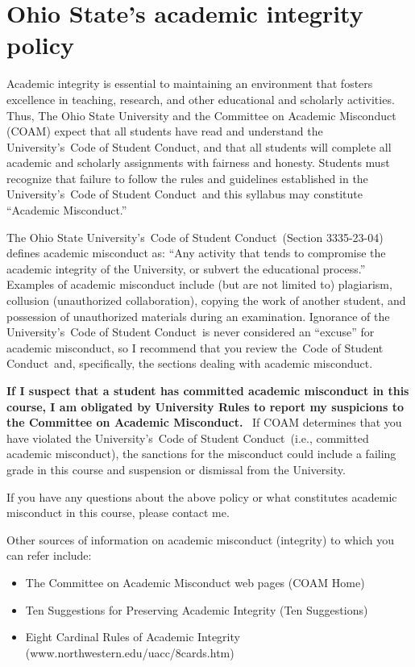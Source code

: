 \documentclass[12pt]{article}
\begin{document}
\newpage

\section*{Ohio State’s academic integrity policy}

Academic integrity is essential to maintaining an environment that fosters excellence in teaching, research, and other educational and scholarly activities.
Thus, The Ohio State University and the Committee on Academic Misconduct (COAM) expect that all students have read and understand the University’s Code of Student Conduct, and that all students will complete all academic and scholarly assignments with fairness and honesty.
Students must recognize that failure to follow the rules and guidelines established in the University’s Code of Student Conduct and this syllabus may constitute ``Academic Misconduct.''

The Ohio State University’s Code of Student Conduct (Section 3335-23-04) defines academic misconduct as: ``Any activity that tends to compromise the academic integrity of the University, or subvert the educational process.''
Examples of academic misconduct include (but are not limited to) plagiarism, collusion (unauthorized collaboration), copying the work of another student, and possession of unauthorized materials during an examination.
Ignorance of the University’s Code of Student Conduct is never considered an ``excuse'' for academic misconduct, so I recommend that you review the Code of Student Conduct and, specifically, the sections dealing with academic misconduct.

\textbf{If I suspect that a student has committed academic misconduct in this course, I am obligated by University Rules to report my suspicions to the Committee on Academic Misconduct.} 
If COAM determines that you have violated the University’s Code of Student Conduct (i.e., committed academic misconduct), the sanctions for the misconduct could include a failing grade in this course and suspension or dismissal from the University.

If you have any questions about the above policy or what constitutes academic misconduct in this course, please contact me.

Other sources of information on academic misconduct (integrity) to which you can refer include:
\begin{itemize}
    \item The Committee on Academic Misconduct web pages (COAM Home)
    \item Ten Suggestions for Preserving Academic Integrity (Ten Suggestions)
    \item Eight Cardinal Rules of Academic Integrity (www.northwestern.edu/uacc/8cards.htm)
\end{itemize}
\end{document}
